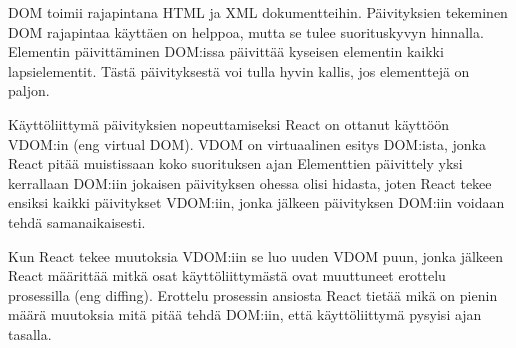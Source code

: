 
DOM toimii rajapintana HTML ja XML dokumentteihin.
Päivityksien tekeminen DOM rajapintaa käyttäen on helppoa, mutta se tulee suorituskyvyn hinnalla.
Elementin päivittäminen DOM:issa päivittää kyseisen elementin kaikki lapsielementit. 
Tästä päivityksestä voi tulla hyvin kallis, jos elementtejä on paljon.
\bigskip





Käyttöliittymä päivityksien nopeuttamiseksi React on ottanut käyttöön VDOM:in (eng virtual DOM).
VDOM on virtuaalinen esitys DOM:ista, jonka React pitää muistissaan koko suorituksen ajan
Elementtien päivittely yksi kerrallaan DOM:iin jokaisen päivityksen ohessa olisi hidasta,
joten React tekee ensiksi kaikki päivitykset VDOM:iin, jonka jälkeen päivityksen DOM:iin voidaan tehdä samanaikaisesti.
%
%
\medskip

Kun React tekee muutoksia VDOM:iin se luo uuden VDOM puun, jonka jälkeen
React määrittää mitkä osat käyttöliittymästä ovat muuttuneet erottelu prosessilla (eng diffing).
Erottelu prosessin ansiosta React tietää mikä on pienin määrä muutoksia mitä pitää tehdä DOM:iin, 
että käyttöliittymä pysyisi ajan tasalla.
\medskip



